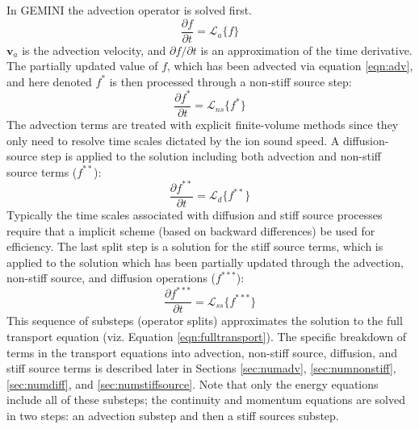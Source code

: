 \documentclass[11pt,letterpaper]{article}
\begin{document}
In GEMINI the advection operator is solved first.
\begin{equation}
\frac{\partial f}{\partial t} = \mathcal{L}_a \{f\} \label{eqn:adv}
\end{equation}
$\mathbf{v}_a$ is the advection velocity, and $\partial f / \partial t$ is an approximation of the time derivative.  The partially updated value of $f$, which has been advected via equation \ref{eqn:adv}, and here denoted $f^*$ is then processed through a non-stiff source step:
\begin{equation}
\frac{\partial f^*}{\partial t} = \mathcal{L}_{ns} \{f^*\} 
\end{equation}
The advection terms are treated with explicit finite-volume methods since they only need to resolve time scales dictated by the ion sound speed.  A diffusion-source step is applied to the solution including both advection and non-stiff source terms ($f^{**}$):  
\begin{equation}
\frac{\partial f^{**}}{\partial t} = \mathcal{L}_d \{f^{**}\} 
\end{equation}
Typically the time scales associated with diffusion and stiff source processes require that a implicit scheme (based on backward differences) be used for efficiency.  The last split step is a solution for the stiff source terms, which is applied to the solution which has been partially updated through the advection, non-stiff source, and diffusion operations ($f^{***}$):
\begin{equation}
\frac{\partial f^{***}}{\partial t} = \mathcal{L}_{ss} \{f^{***}\} 
\end{equation}
This sequence of substeps (operator splits) approximates the solution to the full transport equation (viz. Equation \ref{eqn:fulltransport}).  The specific breakdown of terms in the transport equations into advection, non-stiff source, diffusion, and stiff source terms is described later in Sections \ref{sec:numadv}, \ref{sec:numnonstiff}, \ref{sec:numdiff}, and \ref{sec:numstiffsource}.  Note that only the energy equations include all of these substeps; the continuity and momentum equations are solved in two steps:  an advection substep and then a stiff sources substep.  
\end{document}
